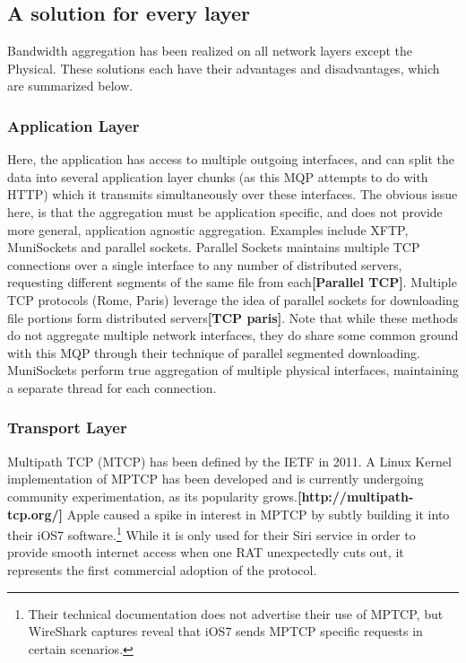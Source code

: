 \documentclass[12pt]{article}
\newcommand{\lcite}[1]
{{\bfseries\color{orange}[#1]}}
\begin{document}
\subsection{A solution for every layer}

	Bandwidth aggregation has been realized on all network layers except the Physical. These solutions each have their advantages and disadvantages, which are summarized below.

	\subsubsection{Application Layer}
		Here, the application has access to multiple outgoing interfaces, and can split the data into several application layer chunks (as this MQP attempts to do with HTTP) which it transmits simultaneously over these interfaces. The obvious issue here, is that the aggregation must be application specific, and does not provide more general, application agnostic aggregation. Examples include XFTP, MuniSockets and parallel sockets. Parallel Sockets maintains multiple TCP connections over a single interface to any number of distributed servers, requesting different segments of the same file from each\lcite{Parallel TCP}. Multiple TCP protocols (Rome, Paris) leverage the idea of parallel sockets for downloading file portions form distributed servers\lcite{TCP paris}. Note that while these methods do not aggregate multiple network interfaces, they do share some common ground with this MQP through their technique of parallel segmented downloading. MuniSockets perform true aggregation of multiple physical interfaces, maintaining a separate thread for each connection. 

	\subsubsection{Transport Layer}
		Multipath TCP (MTCP) has been defined by the IETF in 2011. A Linux Kernel implementation of MPTCP has been developed and is currently undergoing community experimentation, as its popularity grows.\lcite{http://multipath-tcp.org/} Apple caused a spike in interest in MPTCP by subtly building it into their iOS7 software.\footnote{Their technical documentation does not advertise their use of MPTCP, but WireShark captures reveal that iOS7 sends MPTCP specific requests in certain scenarios.} While it is only used for their Siri service in order to provide smooth internet access when one RAT unexpectedly cuts out, it represents the first commercial adoption of the protocol. 
\end{document}
